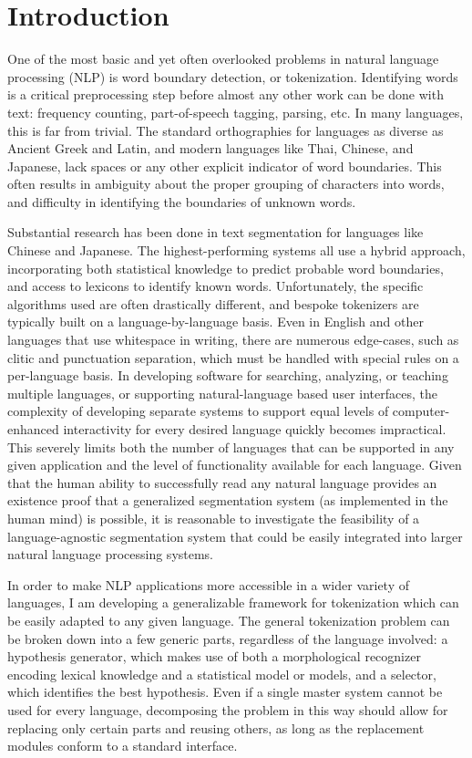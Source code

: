 \chapter{Introduction}

One of the most basic and yet often overlooked problems in natural language processing (NLP) is word boundary detection, or tokenization. Identifying words is a critical preprocessing step before almost any other work can be done with text: frequency counting, part-of-speech tagging, parsing, etc.
In many languages, this is far from trivial. The standard orthographies for languages as diverse as Ancient Greek and Latin, and modern languages like Thai, Chinese, and Japanese, lack spaces or any other explicit indicator of word boundaries. This often results in ambiguity about the proper grouping of characters into words, and difficulty in identifying the boundaries of unknown words.

Substantial research has been done in text segmentation for languages like Chinese and Japanese. The highest-performing systems all use a hybrid approach, incorporating both statistical knowledge to predict probable word boundaries, and access to lexicons to identify known words. Unfortunately, the specific algorithms used are often drastically different, and bespoke tokenizers are typically built on a language-by-language basis. Even in English and other languages that use whitespace in writing, there are numerous edge-cases, such as clitic and punctuation separation, which must be handled with special rules on a per-language basis. In developing software for searching, analyzing, or teaching multiple languages, or supporting natural-language based user interfaces, the complexity of developing separate systems to support equal levels of computer-enhanced interactivity for every desired language quickly becomes impractical. This severely limits both the number of languages that can be supported in any given application and the level of functionality available for each language. Given that the human ability to successfully read any natural language provides an existence proof that a generalized segmentation system (as implemented in the human mind) is possible, it is reasonable to investigate the feasibility of a language-agnostic segmentation system that could be easily integrated into larger natural language processing systems.

In order to make NLP applications more accessible in a wider variety of languages, I am developing a generalizable framework for tokenization which can be easily adapted to any given language. The general tokenization problem can be broken down into a few generic parts, regardless of the language involved: a hypothesis generator, which makes use of both a morphological recognizer encoding lexical knowledge and a statistical model or models, and a selector, which identifies the best hypothesis. Even if a single master system cannot be used for every language, decomposing the problem in this way should allow for replacing only certain parts and reusing others, as long as the replacement modules conform to a standard interface.

